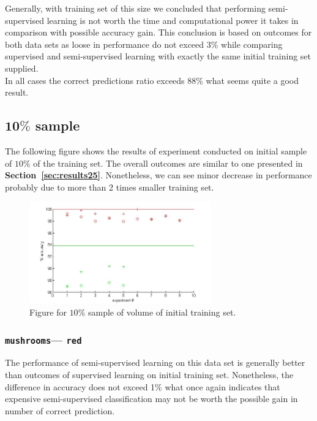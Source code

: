 \documentclass[12pt, a4paper, pdflatex]{report}
\begin{document}
Generally, with training set of this size we concluded that performing semi-supervised learning is not worth the time and computational power it takes in comparison with possible accuracy gain. This conclusion is based on outcomes for both data sets as loose in performance do not exceed 3\% while comparing supervised and semi-supervised learning with exactly the same initial training set supplied.\\
In all cases the correct predictions ratio exceeds 88\% what seems quite a good result.

\subsection{$\mathbf{10\%}$ sample~\cite{results10}\label{sec:results10}}
The following figure shows the results of experiment conducted on initial sample of $10\%$ of the training set. The overall outcomes are similar to one presented in \textbf{Section~\ref{sec:results25}}. Nonetheless, we can see minor decrease in performance probably due to more than 2 times smaller training set.

\begin{figure}[htbp]
\centering
  \includegraphics[width=0.7\textwidth]{graphics/figures/Pfig2.jpg}
\begin{tiny}
\caption{\small Figure for $10\%$ sample of volume of initial training set.\label{img:10pc}}
\end{tiny}
\end{figure}

\subsubsection{\texttt{mushrooms}--- \texttt{red}}
The performance of semi-supervised learning on this data set is generally better than outcomes of supervised learning on initial training set. Nonetheless, the difference in accuracy does not exceed 1\% what once again indicates that expensive semi-supervised classification may not be worth the possible gain in number of correct prediction.
\end{document}
